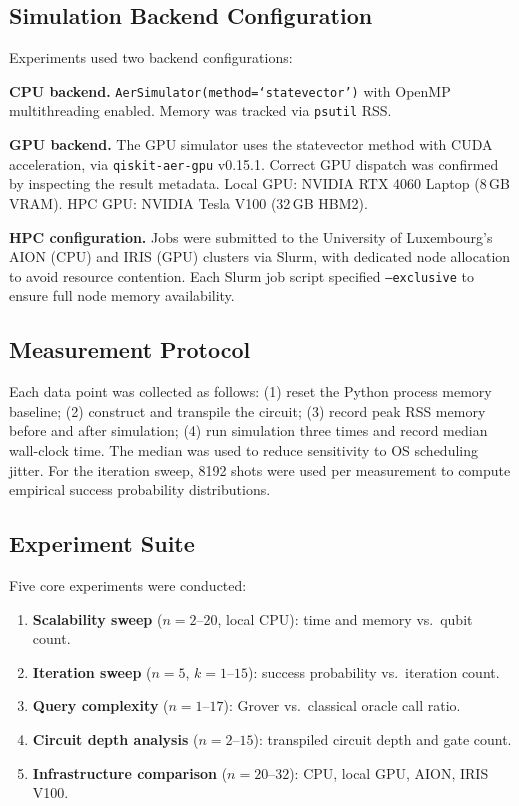 \documentclass[sigconf, authorversion, nonacm]{acmart}
\begin{document}
\subsection{Simulation Backend Configuration}

Experiments used two backend configurations:

\textbf{CPU backend.} \texttt{AerSimulator(method=`statevector')} with OpenMP multithreading enabled. Memory was tracked via \texttt{psutil} RSS.

\textbf{GPU backend.} The GPU simulator uses the statevector method with CUDA acceleration, via \texttt{qiskit-aer-gpu} v0.15.1. Correct GPU dispatch was confirmed by inspecting the result metadata. Local GPU: NVIDIA RTX 4060 Laptop (8\,GB VRAM). HPC GPU: NVIDIA Tesla V100 (32\,GB HBM2).

\textbf{HPC configuration.} Jobs were submitted to the University of Luxembourg's AION (CPU) and IRIS (GPU) clusters via Slurm, with dedicated node allocation to avoid resource contention. Each Slurm job script specified \texttt{--exclusive} to ensure full node memory availability.

\subsection{Measurement Protocol}

Each data point was collected as follows: (1) reset the Python process memory baseline; (2) construct and transpile the circuit; (3) record peak RSS memory before and after simulation; (4) run simulation three times and record median wall-clock time. The median was used to reduce sensitivity to OS scheduling jitter. For the iteration sweep, 8192 shots were used per measurement to compute empirical success probability distributions.

\subsection{Experiment Suite}

Five core experiments were conducted:

\begin{enumerate}
  \item \textbf{Scalability sweep} ($n = 2$--$20$, local CPU): time and memory vs.\ qubit count.
  \item \textbf{Iteration sweep} ($n=5$, $k=1$--$15$): success probability vs.\ iteration count.
  \item \textbf{Query complexity} ($n=1$--$17$): Grover vs.\ classical oracle call ratio.
  \item \textbf{Circuit depth analysis} ($n=2$--$15$): transpiled circuit depth and gate count.
  \item \textbf{Infrastructure comparison} ($n=20$--$32$): CPU, local GPU, AION, IRIS V100.
\end{enumerate}
\end{document}
